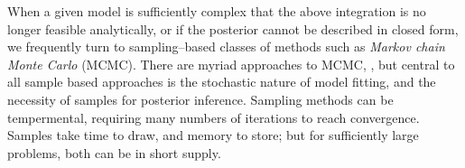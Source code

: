 When a given model is sufficiently complex that the above integration is no
    longer feasible analytically, or if the posterior cannot be described in
    closed form, we frequently 
    turn to sampling--based classes of methods such as 
    \emph{Markov chain Monte Carlo} (MCMC)\needcite. There are myriad approaches 
    to MCMC, , but central to all sample
    based approaches is the stochastic nature of model fitting, and the 
    necessity of samples for posterior inference.  Sampling methods can be 
    tempermental, requiring many numbers of iterations to reach convergence.
    Samples take time to draw, and memory to store; but for sufficiently large 
    problems, both can be in short supply.




